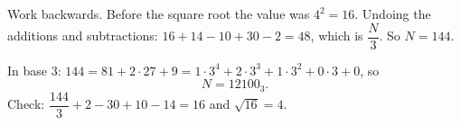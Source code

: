 Work backwards. Before the square root the value was $4^2=16$. Undoing the additions and subtractions: $16+14-10+30-2=48$, which is $\dfrac {N}{3}$. So $N=144$.

In base $3$: $144=81+2\cdot27+9=1\cdot3^4+2\cdot3^3+1\cdot3^2+0\cdot3+0$, so
\[
N=\boxed{12100_3}.
\]
Check: $\dfrac{144}{3}+2-30+10-14=16$ and $\sqrt{16}=4$.
